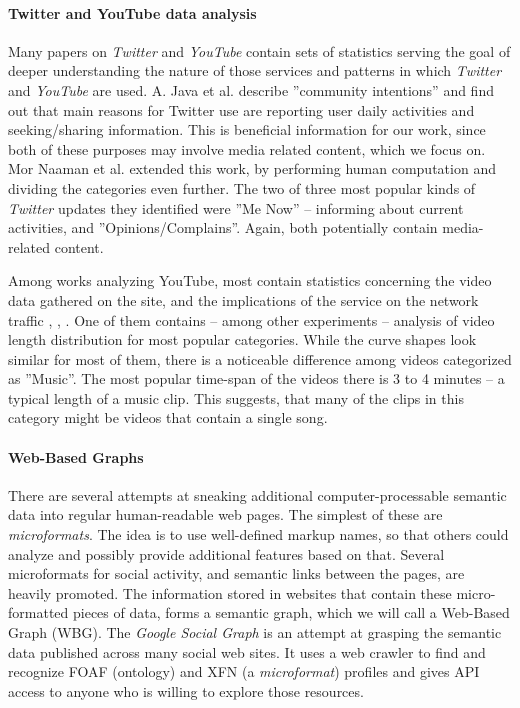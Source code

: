 \paragraph{Twitter and YouTube data analysis} Many papers on \textit{Twitter}
and \textit{YouTube} contain sets of statistics serving the goal of
deeper understanding the nature of those services and patterns in which
\textit{Twitter} and \textit{YouTube} are used. A. Java et al. \cite{why-we-twitter}
describe ''community intentions'' and find out that main reasons for
Twitter use are reporting user daily activities and seeking/sharing information. This
is beneficial information for our work, since both of these purposes may involve media
related content, which we focus on. Mor Naaman et al. \cite{twitter-content-is-it}
extended this work, by performing human computation and dividing the categories even further.
The two of three most popular kinds of \textit{Twitter} updates they identified were
''Me Now'' -- informing about current activities, and ''Opinions/Complains''.
Again, both potentially contain media-related content.

Among works analyzing YouTube, most contain statistics concerning the video
data gathered on the site, and the implications of the service on the network
traffic \cite{i-tube-you-tube}, \cite{views-from-the-edge},
\cite{statistics-and-social-network}. One of them
\cite{statistics-and-social-network} contains -- among other experiments --
analysis of video length distribution for most popular categories.  While the
curve shapes look similar for most of them, there is a noticeable difference
among videos categorized as ''Music''. The most popular time-span of the videos
there is 3 to 4 minutes -- a typical length of a music clip. This suggests,
that many of the clips in this category might be videos that contain a single song.

\paragraph{Web-Based Graphs} There are several attempts at sneaking additional
computer-processable semantic data into regular human-readable web pages.  The
simplest of these are \textit{microformats}. The idea is to use well-defined
markup names, so that others could analyze and possibly provide additional
features based on that. Several microformats for social activity, and semantic
links between the pages, are heavily promoted. The information stored in
websites that contain these micro-formatted pieces of data, forms a semantic
graph, which we will call a Web-Based Graph (WBG).  
The \textit{Google Social Graph} is an attempt at grasping
the semantic data published across many social web sites. It uses a web
crawler to find and recognize FOAF (ontology) and XFN (a \textit{microformat}) profiles
and gives API access to anyone who is willing to explore those resources.

